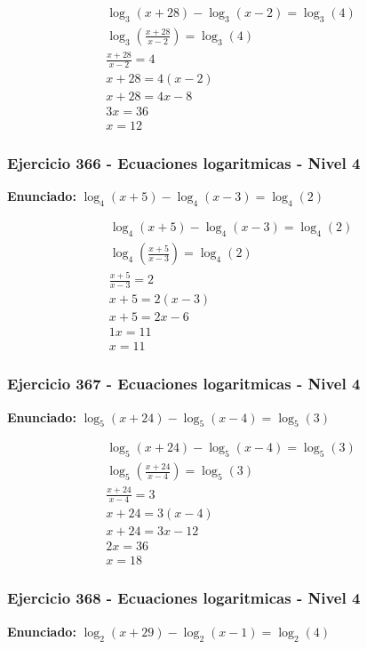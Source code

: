 \documentclass[12pt,a4paper]{article}
\begin{document}
\[
\begin{aligned}
\log_{3}\left(x+28\right) - \log_{3}\left(x-2\right)=\log_{3}\left(4\right)\\
\log_{3}\left(\frac{x+28}{x-2}\right)=\log_{3}\left(4\right)\\
\frac{x+28}{x-2}=4\\
x+28=4(x-2)\\
x+28=4x-8\\
3x=36\\
\boxed{x=12}
\end{aligned}
\]


\subsubsection*{Ejercicio 366 - Ecuaciones logaritmicas - Nivel 4}
\textbf{Enunciado:} \(\log_{4}\left(x+5\right) - \log_{4}\left(x-3\right)=\log_{4}\left(2\right)\)

\[
\begin{aligned}
\log_{4}\left(x+5\right) - \log_{4}\left(x-3\right)=\log_{4}\left(2\right)\\
\log_{4}\left(\frac{x+5}{x-3}\right)=\log_{4}\left(2\right)\\
\frac{x+5}{x-3}=2\\
x+5=2(x-3)\\
x+5=2x-6\\
1x=11\\
\boxed{x=11}
\end{aligned}
\]


\subsubsection*{Ejercicio 367 - Ecuaciones logaritmicas - Nivel 4}
\textbf{Enunciado:} \(\log_{5}\left(x+24\right) - \log_{5}\left(x-4\right)=\log_{5}\left(3\right)\)

\[
\begin{aligned}
\log_{5}\left(x+24\right) - \log_{5}\left(x-4\right)=\log_{5}\left(3\right)\\
\log_{5}\left(\frac{x+24}{x-4}\right)=\log_{5}\left(3\right)\\
\frac{x+24}{x-4}=3\\
x+24=3(x-4)\\
x+24=3x-12\\
2x=36\\
\boxed{x=18}
\end{aligned}
\]


\subsubsection*{Ejercicio 368 - Ecuaciones logaritmicas - Nivel 4}
\textbf{Enunciado:} \(\log_{2}\left(x+29\right) - \log_{2}\left(x-1\right)=\log_{2}\left(4\right)\)
\end{document}
